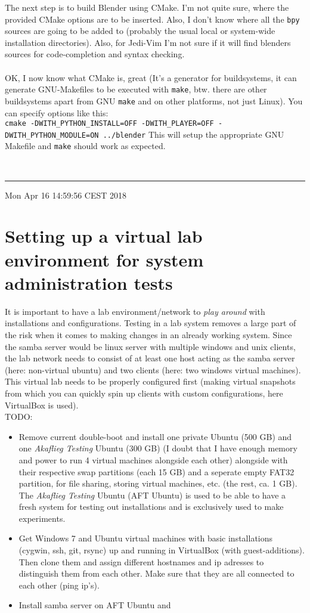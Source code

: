 \documentclass[12pt]{article}
\begin{document}
The next step is to build Blender using CMake. I'm not quite sure, where the provided CMake options are to be inserted. Also, I don't know where all the \texttt{bpy} sources are going to be added to (probably the usual local or system-wide installation directories). Also, for Jedi-Vim I'm not sure if it will find blenders sources for code-completion and syntax checking. \\
\\
OK, I now know what CMake is, great (It's a generator for buildsystems, it can generate GNU-Makefiles to be executed with \texttt{make}, btw. there are other buildsystems apart from GNU \texttt{make} and on other platforms, not just Linux). You can specify options like this: \\
\texttt{cmake -DWITH\_PYTHON\_INSTALL=OFF -DWITH\_PLAYER=OFF -DWITH\_PYTHON\_MODULE=ON ../blender}
This will setup the appropriate GNU Makefile and \texttt{make} should work as expected.


\ \\ \noindent\rule{\textwidth}{1pt}
Mon Apr 16 14:59:56 CEST 2018


\section*{Setting up a virtual lab environment for system administration tests}
It is important to have a lab environment/network to \textit{play around} with installations and configurations. Testing in a lab system removes a large part of the risk when it comes to making changes in an already working system. Since the samba server would be linux server with multiple windows and unix clients, the lab network needs to consist of at least one host acting as the samba server (here: non-virtual ubuntu) and two clients (here: two windows virtual machines). This virtual lab needs to be properly configured first (making virtual snapshots from which you can quickly spin up clients with custom configurations, here VirtualBox is used). \\
TODO: 
\begin{itemize}
    \item Remove current double-boot and install one private Ubuntu (500 GB) and one \textit{Akaflieg Testing} Ubuntu (300 GB) (I doubt that I have enough memory and power to run 4 virtual machines alongside each other) alongside with their respective swap partitions (each 15 GB) and a seperate empty FAT32 partition, for file sharing, storing virtual machines, etc. (the rest, ca. 1 GB). The \textit{Akaflieg Testing} Ubuntu (AFT Ubuntu) is used to be able to have a fresh system for testing out installations and is exclusively used to make experiments. 
    \item Get Windows 7 and Ubuntu virtual machines with basic installations (cygwin, ssh, git, rsync) up and running in VirtualBox (with guest-additions). Then clone them and assign different hostnames and ip adresses to distinguish them from each other. Make sure that they are all connected to each other (ping ip's).
    \item Install samba server on AFT Ubuntu and 
\end{itemize}
\end{document}
